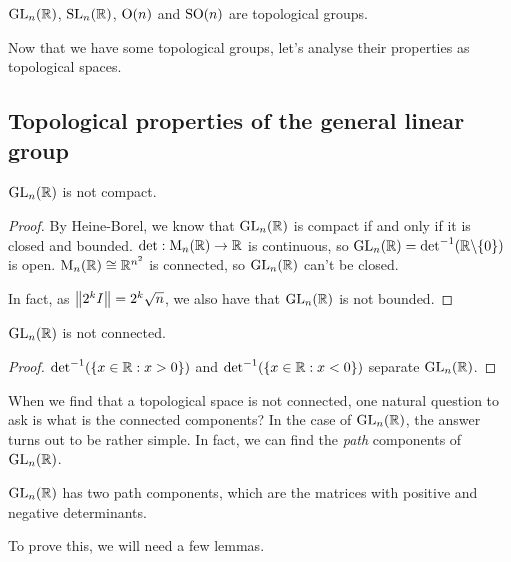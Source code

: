 \documentclass{article}
\begin{document}
    \begin{corollary}
        $\operatorname{GL}_n(\mathbb{R})$, $\operatorname{SL}_n(\mathbb{R})$, $\operatorname{O}(n)$ and $\operatorname{SO}(n)$ are topological groups.
    \end{corollary}

    Now that we have some topological groups, let's analyse their properties as topological spaces.

    \subsection{Topological properties of the general linear group}

    \begin{proposition}
        \label{gl_n_not_compact}
        $\operatorname{GL}_n(\mathbb{R})$ is not compact.
    \end{proposition}

    \begin{proof}
        By Heine-Borel, we know that $\operatorname{GL}_n(\mathbb{R})$ is compact if and only if it is closed and bounded. $\det : \operatorname{M}_n(\mathbb{R}) \to \mathbb{R}$ is continuous, so $\operatorname{GL}_n(\mathbb{R}) = \det^{-1}(\mathbb{R}\backslash\{0\})$ is open. $\operatorname{M}_n(\mathbb{R}) \cong \mathbb{R}^{n^2}$ is connected, so $\operatorname{GL}_n(\mathbb{R})$ can't be closed.

        In fact, as $\norm{2^k I} = 2^k\sqrt{n}$, we also have that $\operatorname{GL}_n(\mathbb{R})$ is not bounded.
    \end{proof}

    \begin{proposition}
        $\operatorname{GL}_n(\mathbb{R})$ is not connected.
    \end{proposition}

    \begin{proof}
        $\det^{-1}(\{x \in \mathbb{R} : x > 0\})$ and $\det^{-1}(\{x \in \mathbb{R} : x < 0\})$ separate $\operatorname{GL}_n(\mathbb{R})$.
    \end{proof}

    When we find that a topological space is not connected, one natural question to ask is what is the connected components? In the case of $\operatorname{GL}_n(\mathbb{R})$, the answer turns out to be rather simple. In fact, we can find the \textit{path} components of $\operatorname{GL}_n(\mathbb{R})$.

    \begin{proposition}
        \label{gl_n_path_components}
        $\operatorname{GL}_n(\mathbb{R})$ has two path components, which are the matrices with positive and negative determinants.
    \end{proposition}

    To prove this, we will need a few lemmas.
\end{document}
